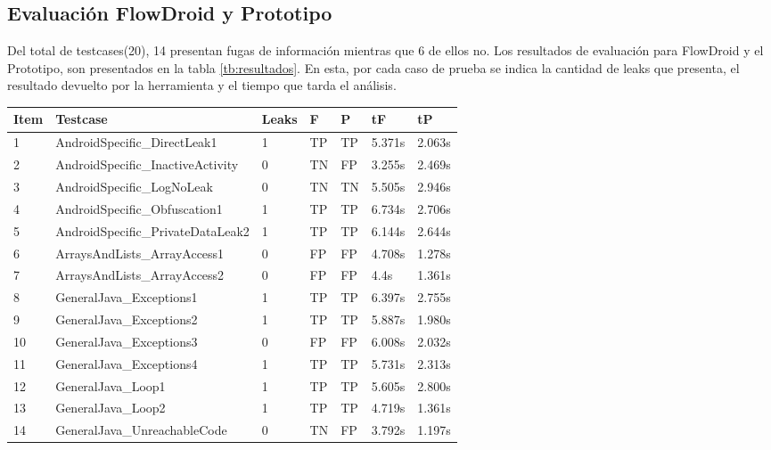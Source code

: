 \subsection{Evaluación FlowDroid y Prototipo } 
\label{subsec:fvsp}
Del total de testcases(20), 14 presentan fugas de información mientras que 6 de
ellos no. Los resultados de evaluación para FlowDroid y el Prototipo, son
presentados en la tabla \ref{tb:resultados}. En esta, por cada caso de prueba
se indica la cantidad de leaks que presenta, el resultado devuelto por la
herramienta y el tiempo que tarda el análisis.

\begin{table}[H]
\begin{center}
\small\addtolength{\tabcolsep}{-3pt}
\begin{tabular}{|p{1cm}|p{6cm}|p{1cm}|p{1cm}|p{1cm}|p{1cm}|p{1cm}|}
	\hline
	\textbf{Item} & \textbf{Testcase} & \textbf{Leaks} & \textbf{F} &
	\textbf{P} & \textbf{ tF} & 
	\textbf{tP}\\
	\hline
	1 & AndroidSpecific\_DirectLeak1 & 1 & TP & TP &5.371s &2.063s\\
	\hline
	2 & AndroidSpecific\_InactiveActivity & 0 & TN & FP  &3.255s &2.469s\\
	\hline
	3 & AndroidSpecific\_LogNoLeak & 0 & TN & TN &5.505s &2.946s\\
	\hline
	4 & AndroidSpecific\_Obfuscation1 & 1 & TP & TP &6.734s &2.706s\\
	\hline
	5 & AndroidSpecific\_PrivateDataLeak2 & 1 & TP & TP & 6.144s &2.644s\\
	\hline
	6 & ArraysAndLists\_ArrayAccess1 & 0 & FP & FP & 4.708s & 1.278s\\
	\hline
	7 & ArraysAndLists\_ArrayAccess2 & 0 & FP & FP & 4.4s &1.361s\\
	 \hline
	8 & GeneralJava\_Exceptions1 & 1 & TP & TP &6.397s &2.755s\\
	\hline
	9 &  GeneralJava\_Exceptions2 & 1 & TP & TP &5.887s &1.980s\\
	\hline
	10 & GeneralJava\_Exceptions3 & 0 & FP & FP &6.008s &2.032s\\
	\hline
	11 & GeneralJava\_Exceptions4 & 1 & TP & TP &5.731s &2.313s\\
	\hline
	12 & GeneralJava\_Loop1 & 1 & TP & TP &5.605s &2.800s\\
	\hline
	13 & GeneralJava\_Loop2 & 1 & TP & TP &4.719s &1.361s\\
	\hline
	14 & GeneralJava\_UnreachableCode & 0 & TN & FP &3.792s &1.197s\\

\end{tabular}
\end{center}
\end{table}
